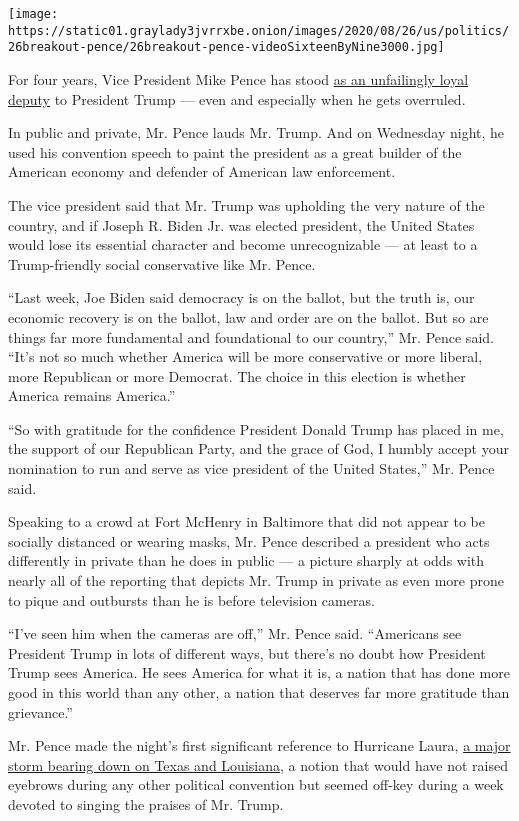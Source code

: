 \texttt{[image: https://static01.graylady3jvrrxbe.onion/images/2020/08/26/us/politics/26breakout-pence/26breakout-pence-videoSixteenByNine3000.jpg]}

For four years, Vice President Mike Pence has stood
\href{https://www.nytimes3xbfgragh.onion/2020/08/26/us/politics/mike-pence-trump-vp.html}{as
an unfailingly loyal deputy} to President Trump --- even and especially
when he gets overruled.

In public and private, Mr. Pence lauds Mr. Trump. And on Wednesday
night, he used his convention speech to paint the president as a great
builder of the American economy and defender of American law
enforcement.

The vice president said that Mr. Trump was upholding the very nature of
the country, and if Joseph R. Biden Jr. was elected president, the
United States would lose its essential character and become
unrecognizable --- at least to a Trump-friendly social conservative like
Mr. Pence.

``Last week, Joe Biden said democracy is on the ballot, but the truth
is, our economic recovery is on the ballot, law and order are on the
ballot. But so are things far more fundamental and foundational to our
country,'' Mr. Pence said. ``It's not so much whether America will be
more conservative or more liberal, more Republican or more Democrat. The
choice in this election is whether America remains America.''

``So with gratitude for the confidence President Donald Trump has placed
in me, the support of our Republican Party, and the grace of God, I
humbly accept your nomination to run and serve as vice president of the
United States,'' Mr. Pence said.

Speaking to a crowd at Fort McHenry in Baltimore that did not appear to
be socially distanced or wearing masks, Mr. Pence described a president
who acts differently in private than he does in public --- a picture
sharply at odds with nearly all of the reporting that depicts Mr. Trump
in private as even more prone to pique and outbursts than he is before
television cameras.

``I've seen him when the cameras are off,'' Mr. Pence said. ``Americans
see President Trump in lots of different ways, but there's no doubt how
President Trump sees America. He sees America for what it is, a nation
that has done more good in this world than any other, a nation that
deserves far more gratitude than grievance.''

Mr. Pence made the night's first significant reference to Hurricane
Laura,
\href{https://www.nytimes3xbfgragh.onion/2020/08/26/us/hurricane-laura-update.html}{a
major storm bearing down on Texas and Louisiana}, a notion that would
have not raised eyebrows during any other political convention but
seemed off-key during a week devoted to singing the praises of Mr.
Trump.

